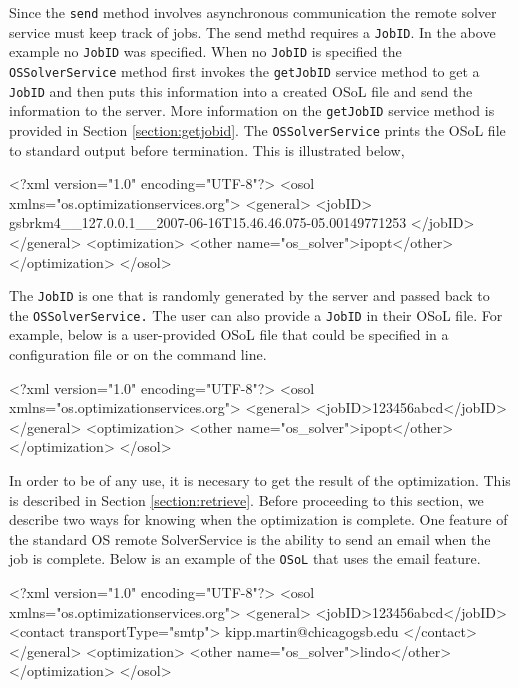 \documentclass[11pt]{article}
\renewcommand{\_}{{\char"5F}}
\renewcommand{\{}{{\char"7B}}
\renewcommand{\}}{{\char"7D}}
\renewcommand{\^}{{\char"0D}}
\renewcommand{\'}{{\char"0D}}
\begin{document}
Since the {\tt send} method involves asynchronous communication the remote solver service must keep track of jobs. The send methd requires a {\tt JobID}. In the above example  no {\tt JobID} was specified. When no {\tt JobID} is specified the {\tt OSSolverService} method first invokes the {\tt getJobID} service method to get a {\tt JobID} and then puts this information into a created OSoL file and send the information to the server. More information on the {\tt getJobID} service method is provided in Section \ref{section:getjobid}.  The {\tt OSSolverService} prints the OSoL file to standard output before termination. This is illustrated below,
\begin{verbatimtab}[4]
<?xml version="1.0" encoding="UTF-8"?> 
<osol xmlns="os.optimizationservices.org">
	<general> 
		<jobID>
		gsbrkm4__127.0.0.1__2007-06-16T15.46.46.075-05.00149771253
		</jobID>
	</general>
    <optimization>
    	<other name="os_solver">ipopt</other>
    </optimization>
</osol>
\end{verbatimtab}
The {\tt JobID} is one that is randomly generated by the server and passed back to the {\tt OSSolverService.} The user can also provide a {\tt JobID} in their OSoL file. For example, below is a user-provided OSoL file that could be specified in a configuration file or on the command line.
\begin{verbatimtab}[4]
<?xml version="1.0" encoding="UTF-8"?>
<osol xmlns="os.optimizationservices.org">
	<general>  
		<jobID>123456abcd</jobID>       
	</general>
    <optimization>
    	<other name="os_solver">ipopt</other>
    </optimization>
</osol>
\end{verbatimtab}

In order to be of any use, it is necesary to get the result of the optimization. This is described in Section \ref{section:retrieve}. Before proceeding to this section, we describe two ways for knowing when the optimization is complete. One feature of the standard OS remote SolverService is the ability to send an email when the job is complete. Below is an example of the {\tt OSoL} that uses the email feature.
\begin{verbatimtab}[4]
<?xml version="1.0" encoding="UTF-8"?>
<osol xmlns="os.optimizationservices.org">
 	<general>  
 		<jobID>123456abcd</jobID>   
 		<contact transportType="smtp">
			kipp.martin@chicagogsb.edu
		</contact>     
	</general>
    <optimization>
    	<other name="os_solver">lindo</other>
    </optimization>
</osol>
\end{verbatimtab}
\end{document}
